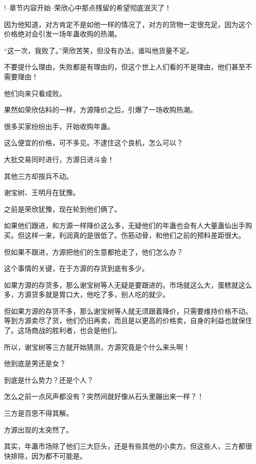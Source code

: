 
\begin{this_body}

!--章节内容开始--荣欣心中那点残留的希望彻底泯灭了！

因为他知道，对方肯定不是如他一样的情况了，对方的货物一定很充足，因为这个价格绝对会引发一场年蛊收购的热潮。

“这一次，我败了。”荣欣苦笑，但没有办法，谁叫他货量不足。

不要提什么理由，失败都是有理由的，但这个世上人们看的不是理由，他们甚至不需要理由！

他们向来只看成败。

果然如荣欣估料的一样，方源降价之后，引爆了一场收购热潮。

很多买家纷纷出手，开始收购年蛊。

这么便宜的价格，可不多见。不逮住这个良机，怎么可以？

大批交易同时进行，方源日进斗金！

其他三方却按兵不动。

谢宝树、王明月在犹豫。

之前是荣欣犹豫，现在轮到他们俩了。

如果他们跟进，和方源一样降价这么多，无疑他们的年蛊也会有人大量蛊仙出手购买。但这样一来，利润真的是很低了。伤筋动骨，和他们之前的预料差距很大。

但如果不跟进，方源把他们的生意都抢走了，他们怎么办？

这个事情的关键，在于方源的存货到底有多少。

如果方源的存货多，那么谢宝树等人无疑是要跟进的。市场就这么大，蛋糕就这么多，方源货多就是胃口大，他吃了多，别人吃的就少。

但如果方源的存货不多，那么谢宝树等人就无须跟着降价，只需要维持价格不动。等到方源卖尽了货，他们仍旧再卖，而且是以更高的价格卖，自身的利益也就保住了。这场商战的胜利者，也会是他们。

所以，谢宝树等三方就开始猜测，方源究竟是个什么来头啊！

他到底是男还是女？

到底是什么势力？还是个人？

怎么之前一点风声都没有？突然间就好像从石头里蹦出来一样？！

三方是百思不得其解。

方源出现的太突然了。

其实，年蛊市场除了他们三大巨头，还是有些其他的小卖方。但这些人，三方都很快排除，因为都不可能是。


\end{this_body}
